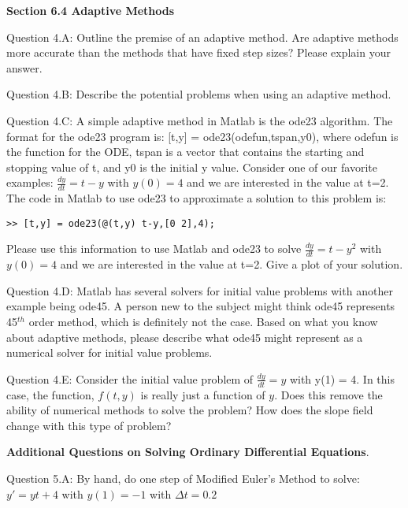 \documentclass{article}
\def\ds{\displaystyle}
\begin{document}
\par \bigskip \par
{\bf Section 6.4 Adaptive Methods} \\ 
\par \medskip \noindent
%
Question 4.A: Outline the premise of an adaptive method. Are adaptive methods more accurate than the methods that have fixed step sizes? Please explain your answer. 
\medskip \par \noindent
%
Question 4.B: Describe the potential problems when using an adaptive method. 
  \medskip \par \noindent
%
Question 4.C: A simple adaptive method in Matlab is the ode23 algorithm. The format for the ode23 program is: [t,y] = ode23(odefun,tspan,y0), where odefun is the function for the ODE, tspan is a vector that contains the starting and stopping value of t, and y0 is the initial y value. Consider one of our favorite examples: $\ds \frac {dy}{dt}=t-y$ with $\ds y(0)=4$ and we are interested in the value at t=2. The code in Matlab to use ode23 to approximate a solution to this problem is:
\begin{verbatim}
>> [t,y] = ode23(@(t,y) t-y,[0 2],4);    
\end{verbatim}
Please use this information to use Matlab and ode23 to solve $\ds \frac {dy}{dt}=t-y^2$ with $\ds y(0)=4$ and we are interested in the value at t=2. Give a plot of your solution. 
\medskip \par \noindent
%
Question 4.D: Matlab has several solvers for initial value problems with another example being ode45. A person new to the subject might think ode45 represents 45$^{th}$ order method, which is definitely not the case. Based on what you know about adaptive methods, please describe what ode45 might represent as a numerical solver for initial value problems.   
\medskip \par \noindent
%
Question 4.E: Consider the initial value problem of $\ds \frac {dy}{dt} = y$ with y(1) = 4. In this case, the function, $f(t,y)$ is really just a function of $y$. Does this remove the ability of numerical methods to solve the problem? How does the slope field change with this type of problem? 
\medskip \par \noindent
{\bf Additional Questions on Solving Ordinary Differential Equations}. \medskip \par \noindent
Question 5.A: By hand, do one step of Modified Euler's Method to solve: $\ds y' = yt+4$ with $y(1)=-1$ with $\ds \Delta t = 0.2$
\end{document}
